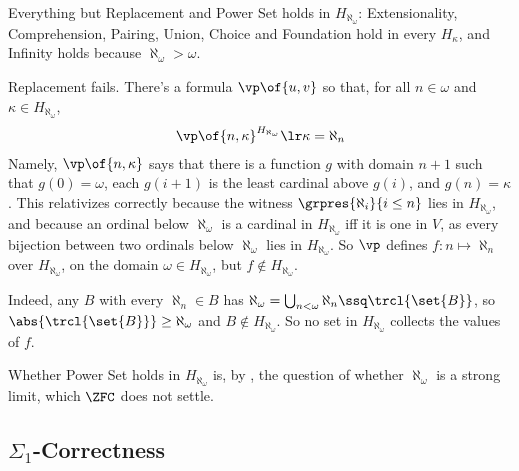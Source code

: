\begin{boxexample}
    Everything but Replacement and Power Set holds in $H_{\aleph_{\omega}}$: Extensionality, Comprehension, Pairing, Union, Choice and Foundation hold in every $H_{\kappa}$, and Infinity holds because $\aleph_{\omega} > \omega$.

    Replacement fails. There's a formula $\vp\of{u, v}$ so that, for all $n \in \omega$ and $\kappa \in H_{\aleph_{\omega}}$,
    \begin{align*}
        \vp\of{n, \kappa}^{H_{\aleph_{\omega}}} \lr \kappa = \aleph_n
    \end{align*}
    Namely, $\vp\of{n, \kappa}$ says that there is a function $g$ with domain $n + 1$ such that $g(0) = \omega$, each $g(i + 1)$ is the least cardinal above $g(i)$, and $g(n) = \kappa$. This relativizes correctly because the witness $\grpres{\aleph_i}{i \leq n}$ lies in $H_{\aleph_{\omega}}$, and because an ordinal below $\aleph_{\omega}$ is a cardinal in $H_{\aleph_{\omega}}$ iff it is one in $V$, as every bijection between two ordinals below $\aleph_{\omega}$ lies in $H_{\aleph_{\omega}}$. So $\vp$ defines $f : n \mapsto \aleph_n$ over $H_{\aleph_{\omega}}$, on the domain $\omega \in H_{\aleph_{\omega}}$, but $f \notin H_{\aleph_{\omega}}$.
    \begin{figure}[H]
        \centering
    \end{figure}
    Indeed, any $B$ with every $\aleph_n \in B$ has $\aleph_{\omega} = \bigcup_{n < \omega} \aleph_n \ssq \trcl{\set{B}}$, so $\abs{\trcl{\set{B}}} \geq \aleph_{\omega}$ and $B \notin H_{\aleph_{\omega}}$. So no set in $H_{\aleph_{\omega}}$ collects the values of $f$.

    Whether Power Set holds in $H_{\aleph_{\omega}}$ is, by , the question of whether $\aleph_{\omega}$ is a strong limit, which $\ZFC$ does not settle.
\end{boxexample}

\subsection{$\Sigma_1$-Correctness}

